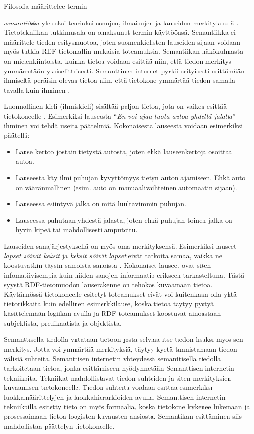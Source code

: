 \documentclass[finnish, 12pt, a4paper, elec, utf8, pdfa, online]{aaltothesis}
\begin{document}
Filosofia määrittelee termin {\textit{semantiikka} yleiseksi teoriaksi sanojen, ilmaisujen ja lauseiden merkityksestä \cite{semantics_phi}. Tietotekniikan tutkimusala on omaksunut termin käyttöönsä. Semantiikka ei määrittele tiedon esitysmuotoa, joten suomenkielisten lauseiden sijaan voidaan myös tutkia RDF-tietomallin mukaisia toteamuksia. Semantiikan näkökulmasta on mielenkiintoista, kuinka tietoa voidaan esittää niin, että tiedon merkitys ymmärretään yksiselitteisesti. Semanttinen internet pyrkii erityisesti esittämään ihmiseltä peräisin olevaa tietoa niin, että tietokone ymmärtää tiedon samalla tavalla kuin ihminen \cite{Berners_visio}.

Luonnollinen kieli (ihmiskieli) sisältää paljon tietoa, jota on vaikea esittää tietokoneelle \cite{semantics}. Esimerkiksi lauseesta ``\textit{En voi ajaa tuota autoa yhdellä jalalla}'' ihminen voi tehdä useita päätelmiä. Kokonaisesta lauseesta voidaan esimerkiksi päätellä:
\begin{itemize}
  \item  Lause kertoo jostain tietystä autosta, joten ehkä lauseenkertoja osoittaa autoa.
  \item  Lauseesta käy ilmi puhujan kyvyttömyys tietyn auton ajamiseen. Ehkä auto on vääränmallinen (esim. auto on manuaalivaihteinen automaatin sijaan).
  \item  Lauseessa esiintyvä jalka on mitä luultavimmin puhujan.
  \item  Lauseessa puhutaan yhdestä jalasta, joten ehkä puhujan toinen jalka on hyvin kipeä tai mahdollisesti amputoitu.
\end{itemize}
Lauseiden sanajärjestyksellä on myös oma merkityksensä. Esimerkiksi lauseet \textit{lapset söivät keksit} ja \textit{keksit söivät lapset} eivät tarkoita samaa, vaikka ne koostuvatkin täysin samoista sanoista \cite{semantics}. Kokonaiset lauseet ovat siten infomatiivisempia kuin niiden sanojen informaatio erikseen tarkasteltuna. Tästä syystä RDF-tietomuodon lauserakenne on tehokas kuvaamaan tietoa. Käytännössä tietokoneelle esitetyt toteamukset eivät voi kuitenkaan olla yhtä tietorikkaita kuin edellinen esimerkkilause, koska tietoa täytyy pystyä käsittelemään logiikan avulla ja RDF-toteamukset koostuvat ainoastaan subjektista, predikaatista ja objektista.

Semanttisella tiedolla viitataan tietoon josta selviää itse tiedon lisäksi myös sen merkitys. Jotta voi ymmärtää merkityksiä, täytyy kyetä tunnistamaan tiedon välisiä suhteita. Semanttisen internetin yhteydessä semanttisella tiedolla tarkoitetaan tietoa, jonka esittämiseen hyödynnetään Semanttisen internetin tekniikoita. Tekniikat mahdollistavat tiedon suhteiden ja siten merkityksien kuvaamisen tietokoneelle. Tiedon suhteita voidaan esittää esimerkiksi luokkamäärittelyjen ja luokkahierarkioiden avulla. Semanttisen internetin tekniikoilla esitetty tieto on myös formaalia, koska tietokone kykenee lukemaan ja prosessoimaan tietoa loogisten kuvausten ansiosta. Semantikan esittäminen siis mahdollistaa päättelyn tietokoneelle.


}
\end{document}
